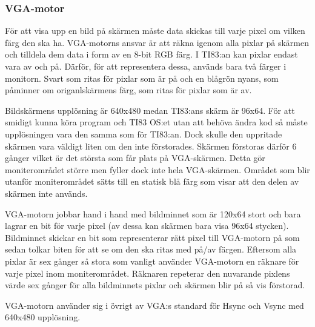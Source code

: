 \documentclass[main.tex]{subfiles}
\begin{document}
\subsubsection{VGA-motor}

För att visa upp en bild på skärmen måste data skickas till varje pixel om
vilken färg den ska ha. VGA-motorns ansvar är att räkna igenom alla pixlar på
skärmen och tilldela dem data i form av en 8-bit RGB färg. I TI83:an kan pixlar
endast vara av och på. Därför, för att representera dessa, används bara två
färger i monitorn. Svart som ritas för pixlar som är på och en blågrön nyans,
som påminner om origanlskärmens färg, som ritas för pixlar som är av.

Bildskärmens upplösning är 640x480 medan TI83:ans skärm är 96x64. För att
smidigt kunna köra program och TI83 OS:et utan att behöva ändra kod så måste
upplösningen vara den samma som för TI83:an. Dock skulle den uppritade skärmen
vara väldigt liten om den inte förstorades. Skärmen förstoras därför 6 gånger
vilket är det största som får plats på VGA-skärmen. Detta gör moniterområdet
större men fyller dock inte hela VGA-skärmen. Området som blir utanför
moniterområdet sätts till en statisk blå färg som visar att den delen av
skärmen inte används. 

VGA-motorn jobbar hand i hand med bildminnet som är 120x64 stort och bara
lagrar en bit för varje pixel (av dessa kan skärmen bara visa 96x64 stycken).
Bildminnet skickar en bit som representerar rätt pixel till VGA-motorn på som
sedan tolkar biten för att se om den ska ritas med på/av färgen. Eftersom alla
pixlar är sex gånger så stora som vanligt använder VGA-motorn en räknare för
varje pixel inom moniterområdet. Räknaren repeterar den nuvarande pixlens värde
sex gånger för alla bildminnets pixlar och skärmen blir på så vis förstorad.
 
VGA-motorn använder sig i övrigt av VGA:s standard för Hsync och Vsync med
640x480 upplösning. \cite{vgastd} 
\end{document}

